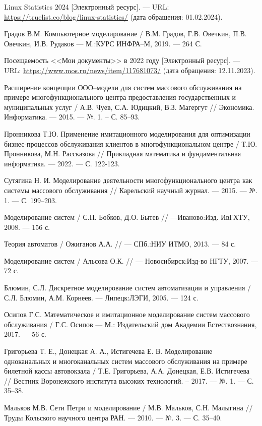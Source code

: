 
\renewcommand\bibname{СПИСОК ИСПОЛЬЗОВАННЫХ ИСТОЧНИКОВ}
\begin{thebibliography}{}
	
\setlength\bibindent{1.25cm}
\makeatletter
\let\old@biblabel\@biblabel
\def\@biblabel#1{\kern\bibindent\old@biblabel{#1}}
\makeatother

 Linux Statistics 2024 [Электронный ресурс]. --- URL: \url{https://truelist.co/blog/linux-statistics/} (дата обращения: 01.02.2024).

 Градов В.М. Компьютерное моделирование / В.М. Градов, Г.В. Овечкин, П.В. Овечкин, И.В. Рудаков --- М.:КУРС ИНФРА--М, 2019. --- 264 С. 

 Посещаемость <<Мои документы>> в 2022 году [Электронный ресурс]. --- URL: \url{https://www.mos.ru/news/item/117681073/} (дата обращения: 12.11.2023).

  Расширение концепции ООО--модели для систем массового обслуживания на примере многофункционального центра предоставления государственных и муниципальных услуг / А.В. Чуев, С.А. Юдицкий, В.З. Магергут // Экономика. Информатика. --- 2015. --- №. 1. – С. 85--93.

 Пронникова Т.Ю. Применение имитационного моделирования для оптимизации бизнес-процессов обслуживания клиентов в многофункциональном центре / Т.Ю. Пронникова, М.Н. Рассказова // Прикладная математика и фундаментальная информатика. --- 2022. --- С. 122-123.

 Сутягина Н. И. Моделирование деятельности многофункционального центра как системы массового обслуживания // Карельский научный журнал. --- 2015. --- №. 1. --- С. 199--203.

 Моделирование систем / С.П. Бобков, Д.О. Бытев // ---Иваново:Изд. ИвГХТУ, 2008. --- 156 с. 

 Теория автоматов / Ожиганов А.А. // --- СПб.:НИУ ИТМО, 2013. --- 84 с. 

 Моделирование систем / Альсова О.К. // --- Новосибирск:Изд-во НГТУ, 2007. --- 72 с.

 Блюмин, С.Л. Дискретное моделирование систем автоматизации и управления / С.Л. Блюмин, А.М. Корнеев. --- Липецк:ЛЭГИ, 2005. --- 124 с.

 Осипов Г.С. Математическое и имитационное моделирование систем массового
обслуживания / Г.С. Осипов --- М.: Издательский дом Академии Естествознания, 2017. --- 56 с.

 Григорьева Т. Е., Донецкая А. А., Истигечева Е. В. Моделирование одноканальных и многоканальных систем массового обслуживания на примере билетной кассы автовокзала / Т.Е. Григорьева, А.А. Донецкая, Е.В. Истигечева  // Вестник Воронежского института высоких технологий. -- 2017. --- №. 1. --- С. 35--38.

 Мальков М.В. Сети Петри и моделирование / М.В. Мальков, С.Н. Малыгина // Труды Кольского научного центра РАН. --- 2010. --- №. 3. --- С. 35--40.

\end{thebibliography}